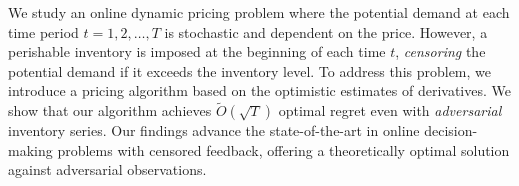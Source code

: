 We study an online dynamic pricing problem where the potential demand at each time period $t=1,2,\ldots, T$ is stochastic and dependent on the price. However, a perishable inventory is imposed at the beginning of each time $t$, \emph{censoring} the potential demand if it exceeds the inventory level. To address this problem, we introduce a pricing algorithm based on the optimistic estimates of derivatives. We show that our algorithm achieves $\tilde{O}(\sqrt{T})$ optimal regret even with \emph{adversarial} inventory series. Our findings advance the state-of-the-art in online decision-making problems with censored feedback, offering a theoretically optimal solution against adversarial observations.